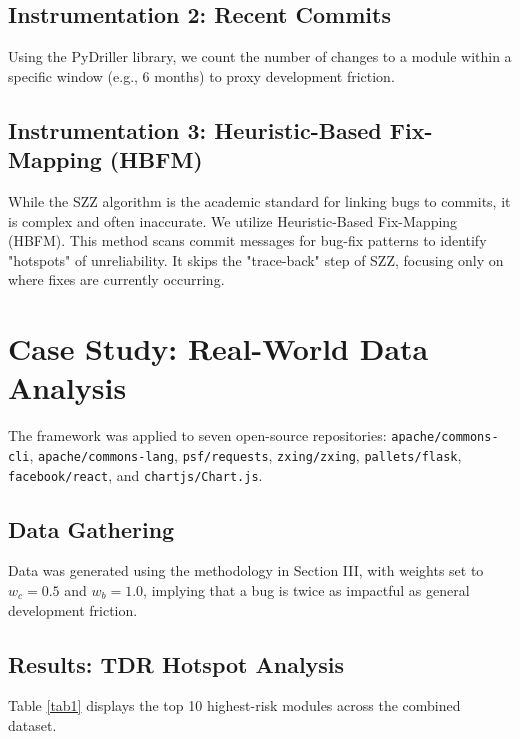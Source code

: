 \documentclass[conference]{IEEEtran}
\begin{document}
\subsection{Instrumentation 2: Recent Commits}
Using the PyDriller library, we count the number of changes to a module within a specific window (e.g., 6 months) to proxy development friction.

\subsection{Instrumentation 3: Heuristic-Based Fix-Mapping (HBFM)}
While the SZZ algorithm is the academic standard for linking bugs to commits, it is complex and often inaccurate. We utilize Heuristic-Based Fix-Mapping (HBFM). This method scans commit messages for bug-fix patterns to identify "hotspots" of unreliability. It skips the "trace-back" step of SZZ, focusing only on where fixes are currently occurring.

\section{Case Study: Real-World Data Analysis}
The framework was applied to seven open-source repositories: \texttt{apache/commons-cli}, \texttt{apache/commons-lang}, \texttt{psf/requests}, \texttt{zxing/zxing}, \texttt{pallets/flask}, \texttt{facebook/react}, and \texttt{chartjs/Chart.js}.

\subsection{Data Gathering}
Data was generated using the methodology in Section III, with weights set to $w_c = 0.5$ and $w_b = 1.0$, implying that a bug is twice as impactful as general development friction.

\subsection{Results: TDR Hotspot Analysis}
Table \ref{tab1} displays the top 10 highest-risk modules across the combined dataset.
\end{document}
